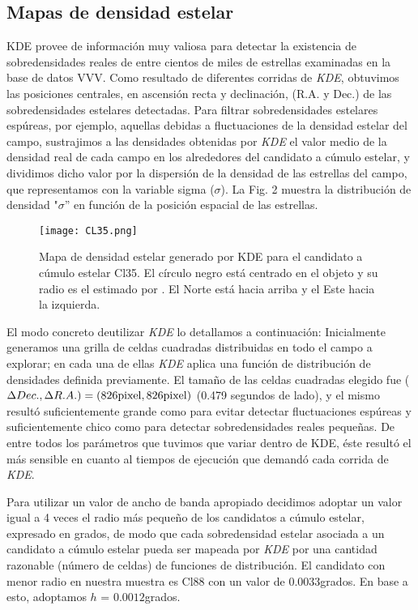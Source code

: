 \documentclass[baaa]{baaa}
\begin{document}
\subsection{Mapas de densidad estelar}
{\sc KDE} provee de información muy valiosa para detectar la existencia de sobredensidades reales de entre cientos de miles de estrellas examinadas en la base de datos VVV. Como resultado de diferentes corridas de \textit{{\sc KDE}}, obtuvimos las posiciones centrales, en ascensión recta y declinación, (R.A. y Dec.) de las sobredensidades estelares detectadas. Para filtrar sobredensidades estelares espúreas, por ejemplo, aquellas debidas a fluctuaciones de la densidad estelar del campo, sustrajimos a las densidades obtenidas por \textit{{\sc KDE}} el valor medio de la densidad real de cada campo en los alrededores del candidato a cúmulo estelar, y dividimos dicho valor por la dispersión  de la densidad de las estrellas del campo, que representamos con la variable sigma ($\sigma$). La Fig. 2 muestra la distribución de densidad "$\sigma$'' en función de la posición espacial de las estrellas.

\begin{figure}
\centering
\texttt{[image: CL35.png]}
\caption{Mapa de densidad estelar generado por {\sc KDE} para el candidato a cúmulo estelar Cl35. El círculo negro está centrado en el objeto y su radio es el estimado por \cite{borissova2011new}. El Norte está hacia arriba y el Este hacia la izquierda.}
\label{fig:N_publications}
\end{figure}


El modo concreto deutilizar \textit{{\sc KDE}} lo detallamos a continuación: Inicialmente generamos una grilla de celdas cuadradas distribuidas en todo el campo a explorar; en cada una de ellas \textit{{\sc KDE}} aplica una función de distribución de densidades definida previamente. El tamaño de las celdas cuadradas elegido fue ($\Delta Dec.  , \Delta R.A.) = (826{\rm pixel},826{\rm pixel})$ (0.479 segundos de lado), y el mismo resultó suficientemente grande como para evitar detectar fluctuaciones espúreas y suficientemente chico como para detectar sobredensidades reales pequeñas. De entre todos los parámetros que tuvimos que variar dentro de {\sc KDE}, éste resultó el más sensible en cuanto al tiempos de ejecución que demandó cada corrida de \textit{{\sc KDE}}.
\par 
Para utilizar un valor de ancho de banda apropiado decidimos adoptar un valor igual a 4 veces el radio más pequeño de los candidatos a cúmulo estelar, expresado en grados, de modo que cada sobredensidad estelar asociada a un candidato a cúmulo estelar pueda ser mapeada por \textit{{\sc KDE}} por una cantidad razonable (número de celdas) de funciones de distribución. El candidato con menor radio en nuestra muestra es Cl88 con un valor de $0.0033$grados. En base a esto, adoptamos $h$ = $0.0012$grados.
\end{document}
